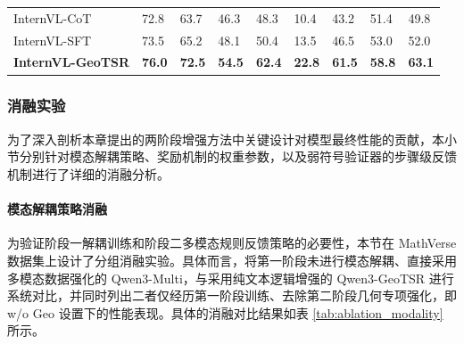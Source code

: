 \begin{table}[H]
\begin{tabularx}{\textwidth}{l Y Y Y Y Y Y Y Y}
    \addlinespace[3pt]
    InternVL-CoT             & 72.8                             & 63.7                              & 46.3                               & 48.3                          & 10.4                        & 43.2                         & 51.4                        & 49.8                         \\
    InternVL-SFT             & 73.5                             & 65.2                              & 48.1                               & 50.4                          & 13.5                        & 46.5                         & 53.0                        & 52.0                         \\
    \textbf{InternVL-GeoTSR} & \textbf{76.0}                    & \textbf{72.5}                     & \textbf{54.5}                      & \textbf{62.4}                 & \textbf{22.8}               & \textbf{61.5}                & \textbf{58.8}               & \textbf{63.1}                \\
    \bottomrule
  \end{tabularx}
\end{table}

\subsubsection{消融实验}

为了深入剖析本章提出的两阶段增强方法中关键设计对模型最终性能的贡献，本小节分别针对模态解耦策略、奖励机制的权重参数，以及弱符号验证器的步骤级反馈机制进行了详细的消融分析。

\paragraph{模态解耦策略消融}

为验证阶段一解耦训练和阶段二多模态规则反馈策略的必要性，本节在 MathVerse 数据集上设计了分组消融实验。具体而言，将第一阶段未进行模态解耦、直接采用多模态数据强化的 Qwen3-Multi，与采用纯文本逻辑增强的 Qwen3-GeoTSR 进行系统对比，并同时列出二者仅经历第一阶段训练、去除第二阶段几何专项强化，即 w/o Geo 设置下的性能表现。具体的消融对比结果如表 \ref{tab:ablation_modality} 所示。

